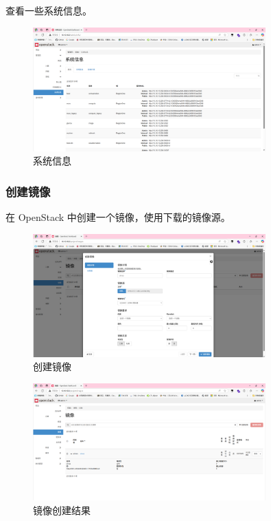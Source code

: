 \documentclass{article}
\begin{document}
查看一些系统信息。

\begin{figure}[H]
    \centering
    \includegraphics[width=0.8\textwidth]{img/7.10.png}
    \caption{系统信息}
\end{figure}

\subsubsection{创建镜像}

在 OpenStack 中创建一个镜像，使用下载的镜像源。

\begin{figure}[H]
    \centering
    \includegraphics[width=0.8\textwidth]{img/8.1.png}
    \caption{创建镜像}
\end{figure}

\begin{figure}[H]
    \centering
    \includegraphics[width=0.8\textwidth]{img/8.2.png}
    \caption{镜像创建结果}
\end{figure}
\end{document}
